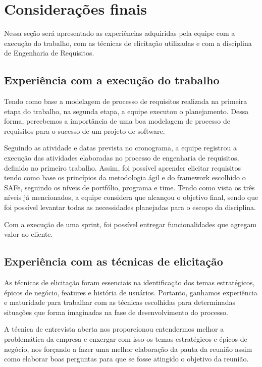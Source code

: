 \chapter[Considera{\c c}{\~o}es finais]{Considerações finais}
Nessa seção será apresentado as experiências adquiridas pela equipe com a execução do trabalho, com as técnicas de elicitação utilizadas e com a disciplina de Engenharia de Requisitos.
\section{Experiência com a execução do trabalho}

Tendo como base a modelagem de processo de requisitos realizada na primeira etapa do trabalho, na segunda etapa, a equipe executou o planejamento. Dessa forma, percebemos a importância de uma boa modelagem de processo de requisitos para o sucesso de um projeto de software.

Seguindo as atividade e datas prevista no cronograma, a equipe registrou a execução das atividades elaboradas no processo de engenharia de requisitos, definido no primeiro trabalho. Assim, foi possível aprender elicitar requisitos tendo como base os princípios da metodologia ágil e do framework escolhido o SAFe, seguindo os níveis de portfólio, programa e time. Tendo como vista os três níveis já mencionados, a equipe considera que alcançou o objetivo final, sendo que foi possível levantar todas as necessidades planejadas para o escopo da disciplina.

Com a execução de uma sprint, foi possível entregar funcionalidades que agregam valor ao cliente.

\section{Experiência com as técnicas de elicitação}

As técnicas de elicitação foram essenciais na identificação dos temas estratégicos, épicos de negócio, features e história de usuários. Portanto, ganhamos experiência e maturidade para trabalhar com as técnicas escolhidas para determinadas situações que forma imaginadas na fase de desenvolvimento do processo. 

A técnica de entrevista aberta nos proporcionou entendermos melhor a problemática da empresa e enxergar com isso os temas estratégicos e épicos de negócio, nos forçando a fazer uma melhor elaboração da pauta da reunião assim como elaborar boas perguntas para que se fosse atingido o objetivo da reunião. 

